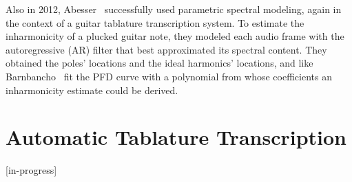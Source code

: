 \documentclass[12pt]{cmuthesis}
\begin{document}
Also in 2012, Abesser~\cite{abesser2012} successfully used parametric spectral modeling, again in the context of a guitar tablature transcription system. To estimate the inharmonicity of a plucked guitar note, they modeled each audio frame with the autoregressive (AR) filter that best approximated its spectral content. They obtained the poles' locations and the ideal harmonics' locations, and like Barnbancho~\cite{barbanchoi2012} fit the PFD curve with a polynomial from whose coefficients an inharmonicity estimate could be derived.

\section{Automatic Tablature Transcription}
[in-progress]


\end{document}
